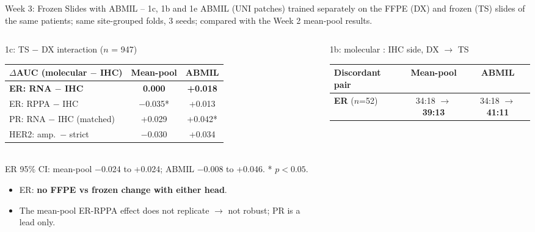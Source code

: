 \documentclass[aspectratio=169,10pt]{beamer}
\begin{document}
\begin{frame}[t]{Week 3: Frozen Slides with ABMIL -- 1c, 1b and 1e}
\footnotesize
ABMIL (UNI patches) trained separately on the FFPE (DX) and frozen (TS) slides of the same patients; same site-grouped
folds, 3 seeds; compared with the Week 2 mean-pool results.

\vspace{4pt}
\begin{columns}[T]
\begin{column}{0.48\textwidth}
\begin{block}{1c: TS $-$ DX interaction ($n$ = 947)}
\centering
\scriptsize
\begin{adjustbox}{max width=\linewidth}
\begin{tabular}{lcc}
\toprule
$\Delta$AUC (molecular $-$ IHC) & Mean-pool & ABMIL \\
\midrule
\textbf{ER: RNA $-$ IHC} & \textbf{0.000} & \textbf{+0.018} \\
ER: RPPA $-$ IHC & $-$0.035* & +0.013 \\
PR: RNA $-$ IHC (matched) & +0.029 & +0.042* \\
HER2: amp.\ $-$ strict & $-$0.030 & +0.034 \\
\bottomrule
\end{tabular}
\end{adjustbox}\\[1pt]
{\tiny ER 95\% CI: mean-pool $-$0.024 to +0.024; ABMIL $-$0.008 to +0.046. * $p<0.05$.}
\end{block}
\begin{itemize}
  \item ER: \textbf{no FFPE vs frozen change with either head}.
  \item The mean-pool ER-RPPA effect does not replicate $\rightarrow$ not robust; PR is a lead only.
\end{itemize}
\end{column}
\begin{column}{0.49\textwidth}
\begin{block}{1b: molecular : IHC side, DX $\rightarrow$ TS}
\centering
\scriptsize
\begin{adjustbox}{max width=\linewidth}
\begin{tabular}{lcc}
\toprule
Discordant pair & Mean-pool & ABMIL \\
\midrule
\textbf{ER} ($n$=52) & 34:18 $\rightarrow$ \textbf{39:13} & 34:18 $\rightarrow$ \textbf{41:11} \\

\end{tabular}
\end{adjustbox}
\end{block}
\end{column}
\end{columns}
\end{frame}
\end{document}
